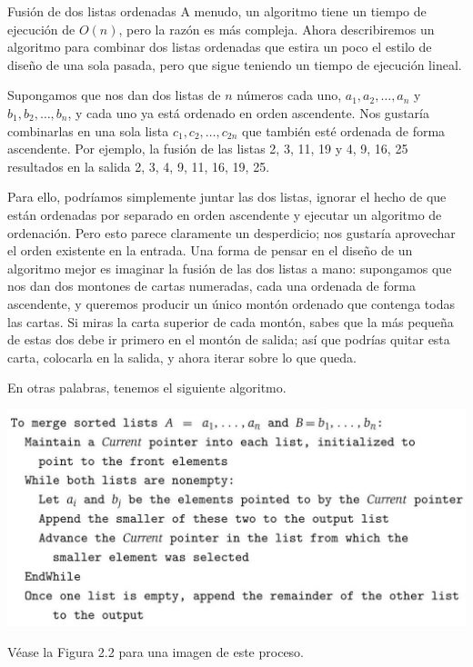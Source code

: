 \documentclass[a4paper, 12pt]{book}
\theoremstyle{dotless}
\begin{document}
Fusión de dos listas ordenadas A menudo, un algoritmo tiene un tiempo de ejecución de $O(n)$, pero la razón es más compleja. Ahora describiremos un algoritmo para combinar dos listas ordenadas que estira un poco el estilo de diseño de una sola pasada, pero que sigue teniendo un tiempo de ejecución lineal.

Supongamos que nos dan dos listas de $n$ números cada uno, $a_{1}, a_{2}, \ldots, a_{n}$ y $b_{1}, b_{2}, \ldots, b_{n}$, y cada uno ya está ordenado en orden ascendente. Nos gustaría combinarlas en una sola lista $c_{1}, c_{2}, \ldots, c_{2 n}$ que también esté ordenada de forma ascendente. Por ejemplo, la fusión de las listas 2, 3, 11, 19 y 4, 9, 16, 25 resultados en la salida 2, 3, 4, 9, 11, 16, 19, 25.

Para ello, podríamos simplemente juntar las dos listas, ignorar el hecho de que están ordenadas por separado en orden ascendente y ejecutar un algoritmo de ordenación. Pero esto parece claramente un desperdicio; nos gustaría aprovechar el orden existente en la entrada. Una forma de pensar en el diseño de un algoritmo mejor es imaginar la fusión de las dos listas a mano: supongamos que nos dan dos montones de cartas numeradas, cada una ordenada de forma ascendente, y queremos producir un único montón ordenado que contenga todas las cartas. Si miras la carta superior de cada montón, sabes que la más pequeña de estas dos debe ir primero en el montón de salida; así que podrías quitar esta carta, colocarla en la salida, y ahora iterar sobre lo que queda.

En otras palabras, tenemos el siguiente algoritmo.


\includegraphics[scale=0.35]{./Imagenes-Seccion2/2023_08_07_379b6f7f3185549667e3g-03(1)}

Véase la Figura 2.2 para una imagen de este proceso.
\end{document}
